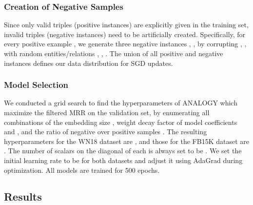 \documentclass{article}
\begin{document}
\subsubsection{Creation of Negative Samples}
Since only valid triples (positive instances) are explicitly given in the training set,
invalid triples (negative instances) need to be artificially created.
Specifically,
for every positive example ,
we generate three negative instances , ,  by corrupting , ,  with random entities/relations , , .
The union of all positive and negative instances
defines our data distribution  for SGD updates.

\subsubsection{Model Selection}
We conducted a grid search to find the hyperparameters of ANALOGY which maximize the filtered MRR on the validation set,
by enumerating all combinations of the embedding size ,
 weight decay factor  of model coefficients  and ,
and the ratio of negative over positive samples .
The resulting hyperparameters for the WN18 dataset are ,
and those for the FB15K dataset are .
The number of scalars on the diagonal of each  is always set to be .
We set the initial learning rate to be  for both datasets and adjust it using AdaGrad during optimization.
All models are trained for 500 epochs.

\subsection{Results}
\end{document}
